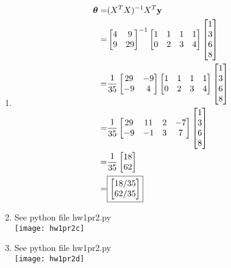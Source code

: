 \documentclass[12pt,letterpaper]{hmcpset}
\begin{document}
\begin{solution}
\begin{enumerate}
    \item \begin{align*}
    \hbox{\boldmath$\theta$} =& (X^TX)^{-1}X^T{\bf y}\\
    =& \begin{bmatrix}
    4 & 9 \\
    9 & 29
  \end{bmatrix}^{-1}
    \begin{bmatrix}
    1 & 1 & 1 & 1\\
    0&2&3 &4
  \end{bmatrix}\begin{bmatrix}
  1\\
    3 \\
    6\\
   8
  \end{bmatrix}\\
  =& \frac{1}{35} \begin{bmatrix}
  29 & -9 \\
  -9 & 4
  \end{bmatrix}   \begin{bmatrix}
    1 & 1 & 1 & 1\\
    0&2&3 &4
  \end{bmatrix}\begin{bmatrix}
  1\\
    3 \\
    6\\
   8
  \end{bmatrix}\\
  =&\frac{1}{35}\begin{bmatrix}
  29 & 11 & 2 & -7 \\
  -9 & -1 & 3 & 7
  \end{bmatrix}\begin{bmatrix}
  1\\
    3 \\
    6\\
   8
  \end{bmatrix}\\
  =& \frac{1}{35}\begin{bmatrix}
  18\\62
  \end{bmatrix}\\
  =& \boxed{\begin{bmatrix}
  18/35\\
  62/35
\end{bmatrix}}
    \end{align*}
    \item See python file hw1pr2.py\\
    \texttt{[image: hw1pr2c]}
    \item See python file hw1pr2.py\\
    \texttt{[image: hw1pr2d]}

    \end{enumerate}
\end{solution}
\newpage
\end{document}
